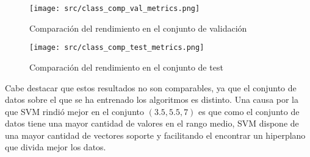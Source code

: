 \begin{figure}[H]
    \centering
    \texttt{[image: src/class\_comp\_val\_metrics.png]}
    \caption{Comparación del rendimiento en el conjunto de validación}
    \label{fig:class_cmp_val}
\end{figure}
\begin{figure}[H]
    \centering
    \texttt{[image: src/class\_comp\_test\_metrics.png]}
    \caption{Comparación del rendimiento en el conjunto de test}
    \label{fig:class_cmp_test}
\end{figure}
Cabe destacar que estos resultados no son comparables, ya que el conjunto de datos sobre el que se ha entrenado los algoritmos es distinto.
Una causa por la que  SVM rindió mejor en el conjunto $(3.5,5.5,7)$ es que como el conjunto de datos tiene una mayor cantidad de valores en el rango medio, SVM dispone de una mayor cantidad de vectores soporte y facilitando el encontrar un hiperplano que divida mejor los datos.
